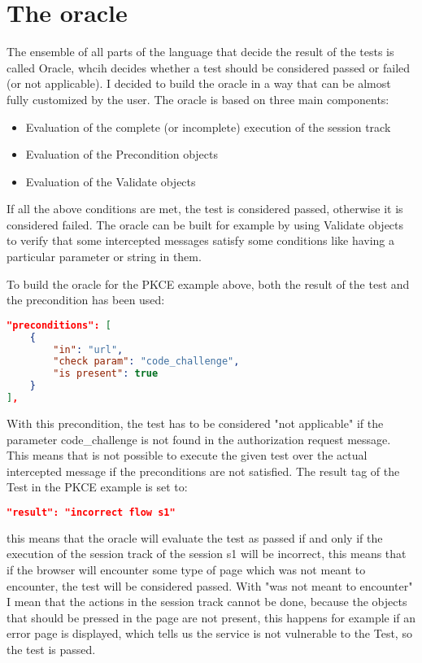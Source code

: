 \section{The oracle}
The ensemble of all parts of the language that decide the result of the tests is called Oracle,
whcih decides whether a test should be considered passed or failed (or not applicable). I decided to build the oracle in a way that can be almost fully customized by the user. 
The oracle is based on three main components:
\begin{itemize}
    \item Evaluation of the complete (or incomplete) execution of the \gls{session track} 
    \item Evaluation of the Precondition objects
    \item Evaluation of the Validate objects
\end{itemize}
If all the above conditions are met, the test is considered passed, otherwise it is considered failed.
The oracle can be built for example by using Validate objects to verify that some intercepted messages satisfy some conditions like having a particular parameter or string in them.

To build the oracle for the PKCE example above, both the result of the test and the precondition has been used:
\begin{lstlisting}[language=json]
"preconditions": [
    {
        "in": "url",
        "check param": "code_challenge",
        "is present": true
    }
],
\end{lstlisting}
With this precondition, the test has to be considered "not applicable" if the parameter code\_challenge is not found in the authorization request message. This means that is not possible to execute the given test over the actual intercepted message if the preconditions are not satisfied.
The result tag of the Test in the PKCE example is set to:
\begin{lstlisting}[language=json]
"result": "incorrect flow s1"
\end{lstlisting}
this means that the oracle will evaluate the test as passed if and only if the execution of the \gls{session track} of the session s1 will be incorrect, this means that if the browser will encounter some type of page which was not meant to encounter, the test will be considered passed. With "was not meant to encounter" I mean that the actions in the \gls{session track} cannot be done, because the objects that should be pressed in the page are not present, this happens for example if an error page is displayed, which tells us the service is not vulnerable to the Test, so the test is passed.

